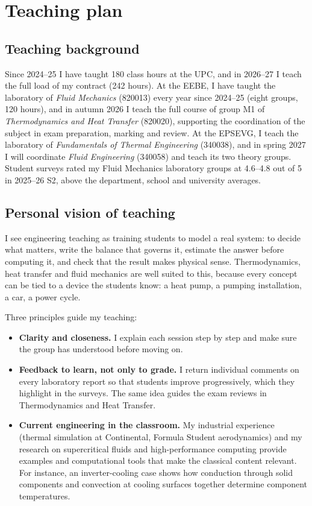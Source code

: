 \documentclass[11pt]{article}
\begin{document}
\section{Teaching plan}\label{sec:teaching}

\subsection{Teaching background}
Since 2024--25 I have taught 180 class hours at the UPC, and in 2026--27 I teach the full
load of my contract (242 hours). At the EEBE, I have taught the laboratory of \emph{Fluid
Mechanics} (820013) every year since 2024--25 (eight groups, 120 hours), and in autumn
2026 I teach the full course of group M1 of \emph{Thermodynamics and Heat Transfer}
(820020), supporting the coordination of the subject in exam preparation, marking and
review. At the EPSEVG, I teach the laboratory of \emph{Fundamentals of Thermal
Engineering} (340038), and in spring 2027 I will coordinate \emph{Fluid Engineering}
(340058) and teach its two theory groups. Student surveys rated my Fluid Mechanics
laboratory groups at 4.6--4.8 out of 5 in 2025--26 S2, above the department, school and
university averages.

\subsection{Personal vision of teaching}
I see engineering teaching as training students to model a real system: to decide what
matters, write the balance that governs it, estimate the answer before computing it, and
check that the result makes physical sense. Thermodynamics, heat transfer and fluid
mechanics are well suited to this, because every concept can be tied to a device the
students know: a heat pump, a pumping installation, a car, a power cycle.

Three principles guide my teaching:
\begin{itemize}
  \item \textbf{Clarity and closeness.} I explain each session step by step and make sure
  the group has understood before moving on.
  \item \textbf{Feedback to learn, not only to grade.} I return individual comments on
  every laboratory report so that students improve progressively, which they highlight in
  the surveys. The same idea guides the exam reviews in Thermodynamics and Heat Transfer.
  \item \textbf{Current engineering in the classroom.} My industrial experience (thermal
  simulation at Continental, Formula Student aerodynamics) and my research on supercritical
  fluids and high-performance computing provide examples and computational tools that make
  the classical content relevant. For instance, an inverter-cooling case shows how
  conduction through solid components and convection at cooling surfaces together
  determine component temperatures.
\end{itemize}
\end{document}
